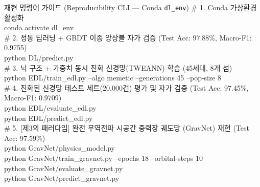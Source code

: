 \documentclass[11pt,a4paper]{article}
\begin{document}
\begin{codebox}{재현 명령어 가이드 (Reproducibility CLI --- Conda \texttt{dl\_env})}
\ttfamily\footnotesize
\# 1. Conda 가상환경 활성화\\
conda activate dl\_env\\[3pt]
\# 2. 정통 딥러닝 + GBDT 이종 앙상블 자가 검증 (Test Acc: 97.88\%, Macro-F1: 0.9755)\\
python DL/predict.py\\[3pt]
\# 3. 뇌 구조 + 가중치 동시 진화 신경망(TWEANN) 학습 (45세대, 8개 섬)\\
python EDL/train\_edl.py --algo memetic --generations 45 --pop-size 8\\[3pt]
\# 4. 진화된 신경망 테스트 세트(20,000건) 평가 및 자가 검증 (Test Acc: 97.45\%, Macro-F1: 0.9709)\\
python EDL/evaluate\_edl.py\\
python EDL/predict\_edl.py\\[3pt]
\# 5. [제3의 패러다임] 완전 무역전파 시공간 중력장 궤도망 (GravNet) 재현 (Test Acc: 97.59\%)\\
python GravNet/physics\_model.py\\
python GravNet/train\_gravnet.py --epochs 18 --orbital-steps 10\\
python GravNet/evaluate\_gravnet.py\\
python GravNet/predict\_gravnet.py
\end{codebox}
\end{document}
